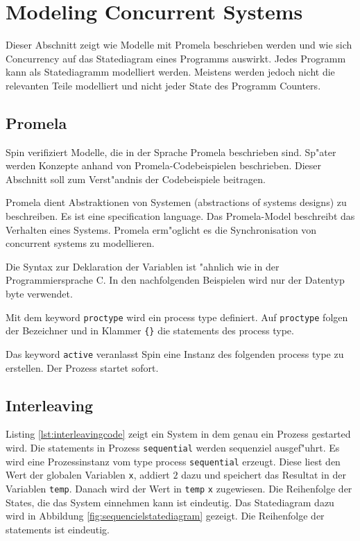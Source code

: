 \documentclass[11pt,twoside,a4paper]{article}
\begin{document}
\section{Modeling Concurrent Systems}
\label{sec:concurrency}

Dieser Abschnitt zeigt wie Modelle mit Promela beschrieben werden und wie sich Concurrency auf das Statediagram eines Programms auswirkt. Jedes Programm kann als Statediagramm modelliert werden. Meistens werden jedoch nicht die relevanten Teile modelliert und nicht jeder State des Programm Counters.

\subsection{Promela}
\label{sec:promela}

Spin verifiziert Modelle, die in der Sprache Promela beschrieben sind. Sp"ater werden Konzepte anhand von Promela-Codebeispielen beschrieben. Dieser Abschnitt soll zum Verst"andnis der Codebeispiele beitragen.

Promela dient Abstraktionen von Systemen (abstractions of systems designs) zu beschreiben. Es ist eine specification language. Das Promela-Model beschreibt das Verhalten eines Systems. Promela erm"oglicht es die Synchronisation von concurrent systems zu modellieren.

Die Syntax zur Deklaration der Variablen ist "ahnlich wie in der Programmiersprache C. In den nachfolgenden Beispielen wird nur der Datentyp byte verwendet.

Mit dem keyword \verb|proctype| wird ein process type definiert. Auf \verb|proctype| folgen der Bezeichner und in Klammer \verb|{}| die statements des process type. \cite{holzmann03}

Das keyword \verb|active| veranlasst Spin eine Instanz des folgenden process type zu erstellen. Der Prozess startet sofort. 

\subsection{Interleaving}
\label{sec:interleaving}

Listing \ref{lst:interleavingcode} zeigt ein System in dem genau ein Prozess gestarted wird. Die statements in Prozess \verb|sequential| werden sequenziel ausgef"uhrt. Es wird eine Prozessinstanz vom type process \verb|sequential| erzeugt. Diese liest den Wert der globalen Variablen \verb|x|, addiert $2$ dazu und speichert das Resultat in der Variablen \verb|temp|. Danach wird der Wert in \verb|temp| \verb|x| zugewiesen. Die Reihenfolge der States, die das System einnehmen kann ist eindeutig. Das Statediagram dazu wird in Abbildung \ref{fig:sequencielstatediagram} gezeigt. Die Reihenfolge der statements ist eindeutig.
\end{document}
